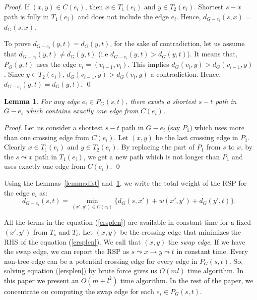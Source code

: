 \documentclass[11pt,a4paper]{llncs}
\newtheorem{lem}[thm]{Lemma}
\begin{document}
\begin{proof}
If $(x,y) \in C(e_{i})$, then $x \in T_{1}(e_{i})$ and $y \in T_{2}(e_{i})$.
Shortest $s-x$ path is fully in $T_{1}(e_{i})$ and does not include
the edge $e_{i}$. Hence, $d_{G-{e_{i}}}(s,x)$ = $d_{G}(s,x)$.

To prove $d_{G-{e_{i}}}(y,t) = d_{G}(y,t)$, for the sake of contradiction,
let us assume that $d_{G-{e_{i}}}(y,t) \neq d_{G}(y,t)$ (i.e $d_{G-{e_{i}}}(y,t) > d_{G}(y,t)$).
It means that, $P_{G}(y,t)$ uses the edge $e_{i} = (v_{i-1}, v_{i})$.
This implies $d_{G}(v_{i}, y) > d_{G}(v_{i-1}, y)$.
Since $y \in T_{2}(e_{i})$, $d_{G}(v_{i-1}, y) > d_{G}(v_{i}, y)$ a contradiction.
Hence, $d_{G-{e_{i}}}(y,t) = d_{G}(y,t)$.
\qed
\end{proof}

\begin{lem}
\label{lemmace}
For any edge $e_{i} \in P_{G}(s,t)$, there exists a shortest $s-t$ path in $G-{e_{i}}$
which contains exactly one edge from $C(e_{i})$.
\end{lem}

\begin{proof}
Let us consider a shortest $s-t$ path in $G-{e_{i}}$ (say $P_{1}$) which
uses more than one crossing edge from $C(e_{i})$. Let $(x, y)$ be the last crossing edge
in $P_{1}$. Clearly $x \in T_{1}(e_{i})$ and $y \in T_{2}(e_{i})$. By replacing the part of $P_{1}$ from
$s$ to $x$, by the $s \leadsto x$ path in $T_{1}(e_{i})$, we get a new path which is not
longer than $P_{1}$ and uses exactly one edge from $C(e_{i})$.
\qed
\end{proof}

Using the Lemmas~\ref{lemmadist} and~\ref{lemmace}, we write the total weight of the RSP for
the edge $e_{i}$
as:
\begin{equation}
\label{ersplen}
d_{G-e_{i}}(s,t)=\min_{(x',y')\in C(e_{i})} \{d_{G}(s,x')+w(x', y')+d_{G}(y',t)\}.
\end{equation}

All the terms in the equation (\ref{ersplen}) are available in constant time
for a fixed $(x',y')$ from $T_{s}$ and $T_{t}$. Let $(x,y)$ be the crossing edge that minimizes
the RHS of the equation (\ref{ersplen}). We call that $(x,y)$ the \emph{swap edge}. If we have the swap edge, we can report
the RSP as $s \leadsto x \rightarrow y \leadsto t$ in constant time. Every non-tree edge can be a potential crossing edge for every edge in $P_{G}(s, t)$. So, solving equation (\ref{ersplen}) by brute force gives us $O(ml)$ time algorithm. In this paper we present an $O(m + l^2)$ time algorithm.
In the rest of the paper, we concentrate on computing the swap edge for each $e_{i} \in P_{G}(s, t)$.
\end{document}
